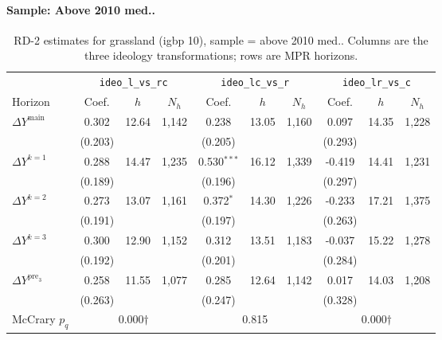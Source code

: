 \documentclass[11pt]{article}
\begin{document}
\paragraph{Sample: Above 2010 med..}
\begin{table}[H]
\centering
\scriptsize
\caption{RD-2 estimates for grassland (igbp 10), sample = above 2010 med..
Columns are the three ideology transformations; rows are MPR horizons.}
\label{tab:rd2_grassland_above}
\begin{tabular}{l ccc ccc ccc}
\toprule
 & \multicolumn{3}{c}{\texttt{ideo\_l\_vs\_rc}}
 & \multicolumn{3}{c}{\texttt{ideo\_lc\_vs\_r}}
 & \multicolumn{3}{c}{\texttt{ideo\_lr\_vs\_c}} \\
\cmidrule(lr){2-4} \cmidrule(lr){5-7} \cmidrule(lr){8-10}
Horizon & Coef. & $h$ & $N_h$ & Coef. & $h$ & $N_h$ & Coef. & $h$ & $N_h$ \\
\midrule
$\Delta Y^{\text{main}}$ & 0.302 & 12.64 & 1,142 & 0.238 & 13.05 & 1,160 & 0.097 & 14.35 & 1,228 \\
 & (0.203) &  &  & (0.205) &  &  & (0.293) &  &  \\
\addlinespace[1pt]
$\Delta Y^{k=1}$ & 0.288 & 14.47 & 1,235 & 0.530$^{***}$ & 16.12 & 1,339 & -0.419 & 14.41 & 1,231 \\
 & (0.189) &  &  & (0.196) &  &  & (0.297) &  &  \\
\addlinespace[1pt]
$\Delta Y^{k=2}$ & 0.273 & 13.07 & 1,161 & 0.372$^{*}$ & 14.30 & 1,226 & -0.233 & 17.21 & 1,375 \\
 & (0.191) &  &  & (0.197) &  &  & (0.263) &  &  \\
\addlinespace[1pt]
$\Delta Y^{k=3}$ & 0.300 & 12.90 & 1,152 & 0.312 & 13.51 & 1,183 & -0.037 & 15.22 & 1,278 \\
 & (0.192) &  &  & (0.201) &  &  & (0.284) &  &  \\
\addlinespace[1pt]
$\Delta Y^{\text{pre}_3}$ & 0.258 & 11.55 & 1,077 & 0.285 & 12.64 & 1,142 & 0.017 & 14.03 & 1,208 \\
 & (0.263) &  &  & (0.247) &  &  & (0.328) &  &  \\
\addlinespace[1pt]
\midrule
McCrary $p_q$ & \multicolumn{3}{c}{0.000$\dagger$} & \multicolumn{3}{c}{0.815} & \multicolumn{3}{c}{0.000$\dagger$} \\
\bottomrule
\end{tabular}
\end{table}
\end{document}
